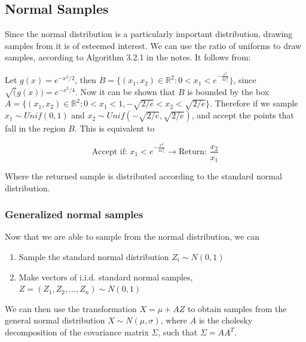 \documentclass{article}
\theoremstyle{definition}
\theoremstyle{remark}
\begin{document}
\subsection{Normal Samples}
Since the normal distribution is a particularly important distribution, drawing samples from it is of esteemed interest. We can use the ratio of uniforms to draw samples, according to Algorithm 3.2.1 in the notes. It follows from: \vspace{1em}

Let $g(x) = e^{-x^2/2}$, then $B = \{(x_1,x_2) \in \mathbb{R}^2 : 0 < x_1 < e^{-\frac{x^2}{4x_1^2}}\}$, since $\sqrt(g(x)) = e^{-x^2/4}$. Now it can be shown that $B$ is bounded by the box $A = \{(x_1,x_2) \in \mathbb{R}^2 : 0 < x_1 < 1, -\sqrt{2/e} < x_2 < \sqrt{2/e}\}$. Therefore if we sample $x_1 \sim Unif(0,1)$ and $x_2 \sim Unif(-\sqrt{2/e}, \sqrt{2/e})$, and accept the points that fall in the region $B$. This is equivalent to

$$\text{Accept if: } x_1 < e^{-\frac{x^2}{4x_1^2}} \to \text{Return:  } \dfrac{x_2}{x_1}$$

Where the returned sample is distributed according to the standard normal distribution. 

\subsubsection{Generalized normal samples}
Now that we are able to sample from the normal distribution, we can
\begin{enumerate}
    \item Sample the standard normal distribution $Z_i \sim N(0,1)$
    \item Make vectors of i.i.d. standard normal samples, $Z= (Z_1, Z_2, \ldots, Z_n) \sim N(0,1)$
\end{enumerate}
We can then use the transformation $X = \mu + A Z$ to obtain samples from the general normal distribution $X \sim N(\mu, \sigma)$, where $A$ is the cholesky decomposition of the covariance matrix $\Sigma$, such that $\Sigma = AA^T$. 
\end{document}
